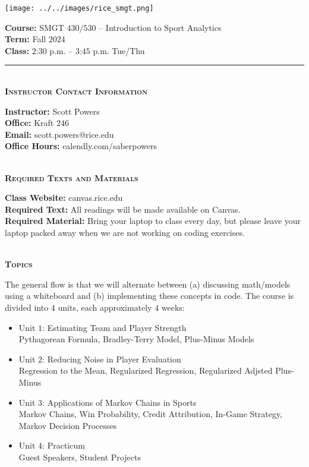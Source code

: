 \documentclass[11pt]{article}
\begin{document}
\begin{minipage}[c]{0.4\linewidth}
  \texttt{[image: ../../images/rice\_smgt.png]}
\end{minipage}
\begin{minipage}[c]{0.6\linewidth}
  \raggedleft
  {\bf Course:} SMGT $430/530$ -- Introduction to Sport Analytics\\
  {\bf Term:} Fall $2024$\\
  {\bf Class:} $2$:$30$ p.m. -- $3$:$45$ p.m. Tue/Thu
\end{minipage}

\hrule

~\\
\textbf{\textsc{Instructor Contact Information}}
\begin{adjustwidth}{1cm}{0cm}
	{\bf Instructor:} Scott Powers\\
  {\bf Office:} Kraft $246$\\
  {\bf Email:} scott.powers@rice.edu\\
  {\bf Office Hours:} calendly.com/saberpowers
\end{adjustwidth}

~\\
\textbf{\textsc{Required Texts and Materials}}
\begin{adjustwidth}{1cm}{0cm}
	{\bf Class Website:} canvas.rice.edu\\
	{\bf Required Text:} All readings will be made available on Canvas.\\
	{\bf Required Material:} Bring your laptop to class every day, but please leave your laptop packed away when we are not working on coding exercises.
\end{adjustwidth}

~\\
\textbf{\textsc{Topics}}
\begin{adjustwidth}{1cm}{0cm}
  The general flow is that we will alternate between (a) discussing math/models using a whiteboard and (b) implementing these concepts in code. The course is divided into $4$ units, each approximately $4$ weeks:
  \begin{itemize}
    \item Unit $1$: Estimating Team and Player Strength\\
    Pythagorean Formula, Bradley-Terry Model, Plus-Minus Models
    \item Unit $2$: Reducing Noise in Player Evaluation\\
    Regression to the Mean, Regularized Regression, Regularized Adjsted Plus-Minus
    \item Unit $3$: Applications of Markov Chains in Sports\\
    Markov Chains, Win Probability, Credit Attribution, In-Game Strategy, Markov Decision Processes
    \item Unit $4$: Practicum\\
    Guest Speakers, Student Projects
  \end{itemize}
\end{adjustwidth}
\end{document}
